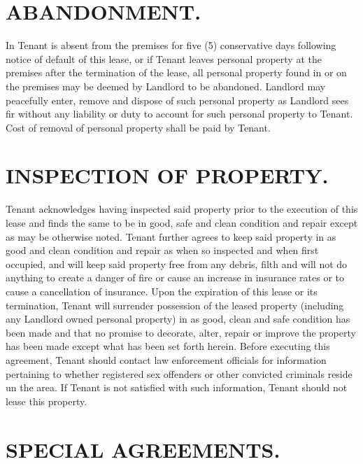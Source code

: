 \documentclass[9pt]{article}
\begin{document}
	\section{ABANDONMENT.}
	In Tenant is absent from the premises for five (5) conservative days following notice of default of this lease, or if Tenant leaves personal property at the premises after the termination of the lease, all personal property found in or on the premises may be deemed by Landlord to be abandoned. Landlord may peacefully enter, remove and dispose of such personal property as Landlord sees fir without any liability or duty to account for such personal property to Tenant. Cost of removal of personal property shall be paid by Tenant.
	
	\section{INSPECTION OF PROPERTY.}
	Tenant acknowledges having inspected said property prior to the execution of this lease and finds the same to be in good, safe and clean condition and repair except as may be otherwise noted. Tenant further agrees to keep said property in as good and clean condition and repair as when so inspected and when first occupied, and will keep said property free from any debris, filth and will not do anything to create a danger of fire or cause an increase in insurance rates or to cause a cancellation of insurance. Upon the expiration of this lease or its termination, Tenant will surrender possession of the leased property (including any Landlord owned personal property) in as good, clean and safe condition has been made and that no promise to decorate, alter, repair or improve the property has been made except what has been set forth herein. Before executing this agreement, Tenant should contact law enforcement officials for information pertaining to whether registered sex offenders or other convicted criminals reside un the area. If Tenant is not satisfied with such information, Tenant should not lease this property.
	
	\section{SPECIAL AGREEMENTS.}
	\TextField[name=4, multiline=true,width=\linewidth,height=15\baselineskip,]{}
	
	
\end{document}
